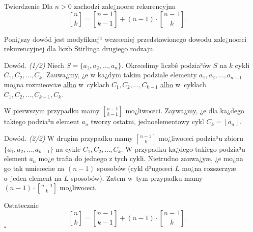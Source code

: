 \documentclass[a4paper,10pt]{beamer}
\begin{document}
\begin{frame}
\begin{block}{Twierdzenie}
Dla $n>0$ zachodzi zale¿noœæ rekurencyjna
$${n\brack k}={{n-1}\brack{k-1}}+(n-1)\cdot{{n-1}\brack k}.$$
\end{block}

\begin{small}Poni¿szy dowód jest modyfikacj¹ wczeœniej przedstawionego dowodu zale¿noœci rekurencyjnej dla liczb Stirlinga drugiego rodzaju.\end{small}

\begin{block}{Dowód. {\it (1/2)}}
Niech $S=\{a_1,a_2,\ldots,a_n\}$. Okreœlimy liczbê podzia³ów $S$ na $k$ cykli $C_1,C_2,\ldots,C_k$. Zauwa¿my, ¿e w ka¿dym takim podziale elementy $a_1,a_2,\ldots,a_{n-1}$ mo¿na rozmieœciæ \underline{albo} w~cyklach $C_1,C_2,\ldots,C_{k-1}$ \underline{albo} w~cyklach  $C_1,C_2,\ldots,C_{k-1},C_k$. 

W pierwszym przypadku mamy $\displaystyle {{n-1}\brack {k-1}}$ mo¿liwoœci. Zaywa¿my, ¿e dla ka¿dego takiego podzia³u element $a_n$ tworzy ostatni, jednoelementowy cykl $C_k=[a_n]$.
\end{block}
\end{frame}



\begin{frame}
\begin{block}{Dowód. \it(2/2)}
W drugim przypadku mamy $\displaystyle{{n-1}\brack k}$ mo¿liwoœci podzia³u zbioru $\{a_1,a_2,\ldots,a_{k-1}\}$ na cykle $C_1,C_2,\ldots,C_k$. W przypadku ka¿dego takiego podzia³u element $a_n$ mo¿e trafia do jednego z tych cykli. Nietrudno zauwa¿yæ, ¿e mo¿na go tak umieœciæ na $(n-1)$ sposobów (cykl d³ugoœci $L$ mo¿na rozszerzyæ o~jeden element na $L$ sposobów).  Zatem w~tym przypadku mamy $\displaystyle (n-1)\cdot {{n-1}\brack k}$ mo¿liwoœci.

\smallskip

Ostatecznie $${n\brack k}={{n-1}\brack{k-1}}+(n-1)\cdot{{n-1}\brack k}.$$
\hfill$\square$
\end{block}
\end{frame}
\end{document}

